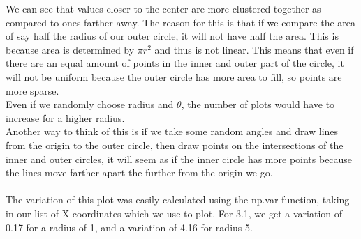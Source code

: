 \documentclass[addpoints]{exam}
\begin{document}
\begin{questions}
We can see that values closer to the center are more clustered together as compared to ones farther away. The reason for this is that if we compare the area of say half the radius of our outer circle, it will not have half the area. This is because area is determined by $\pi r^2$ and thus is not linear. This means that even if there are an equal amount of points in the inner and outer part of the circle, it will not be uniform because the outer circle has more area to fill, so points are more sparse.\\
Even if we randomly choose radius and $\theta$, the number of plots would have to increase for a higher radius.\\
Another way to think of this is if we take some random angles and draw lines from the origin to the outer circle, then draw points on the intersections of the inner and outer circles, it will seem as if the inner circle has more points because the lines move farther apart the further from the origin we go.\\
\\
The variation of this plot was easily calculated using the np.var function, taking in our list of X coordinates which we use to plot. For 3.1, we get a variation of 0.17 for a radius of 1, and a variation of 4.16 for radius 5.


\end{questions}
\end{document}
